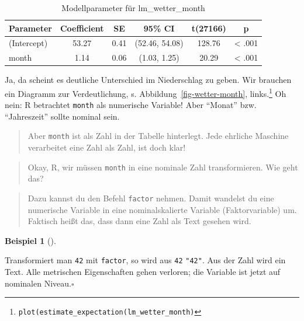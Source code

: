 \documentclass[
  letterpaper,
]{scrbook}
\theoremstyle{definition}
\newtheorem{example}{Beispiel}[chapter]
\theoremstyle{definition}
\theoremstyle{definition}
\theoremstyle{remark}
\begin{document}
\begin{longtable}[]{@{}lccccc@{}}

\caption{\label{tbl-lm_wetter-month}Modellparameter für
lm\_wetter\_month}

\tabularnewline

\toprule\noalign{}
Parameter & Coefficient & SE & 95\% CI & t(27166) & p \\
\midrule\noalign{}
\endhead
\bottomrule\noalign{}
\endlastfoot
(Intercept) & 53.27 & 0.41 & (52.46, 54.08) & 128.76 & \textless{}
.001 \\
month & 1.14 & 0.06 & (1.03, 1.25) & 20.29 & \textless{} .001 \\

\end{longtable}

Ja, da scheint es deutliche Unterschied im Niederschlag zu geben. Wir
brauchen ein Diagramm zur Verdeutlichung, s.
Abbildung~\ref{fig-wetter-month}, links.\footnote{\texttt{plot(estimate\_expectation(lm\_wetter\_month)}}
Oh nein: R betrachtet \texttt{month} als numerische Variable! Aber
``Monat'' bzw. ``Jahreszeit'' sollte nominal sein.

\begin{quote}
{} Aber \texttt{month} ist als Zahl in der Tabelle
hinterlegt. Jede ehrliche Maschine verarbeitet eine Zahl als Zahl, ist
doch klar!
\end{quote}

\begin{quote}
{} Okay, R, wir müssen \texttt{month} in eine nominale Zahl
transformieren. Wie geht das?
\end{quote}

\begin{quote}
{} Dazu kannst du den Befehl \texttt{factor} nehmen. Damit
wandelst du eine numerische Variable in eine nominalskalierte Variable
(Faktorvariable) um. Faktisch heißt das, dass dann eine Zahl als Text
gesehen wird.
\end{quote}

\begin{example}[]\protect\hypertarget{exm-factor}{}\label{exm-factor}

Transformiert man \texttt{42} mit \texttt{factor}, so wird aus
\texttt{42} \texttt{"42"}. Aus der Zahl wird ein Text. Alle metrischen
Eigenschaften gehen verloren; die Variable ist jetzt auf nominalen
Niveau.\(\square\)

\end{example}
\end{document}
